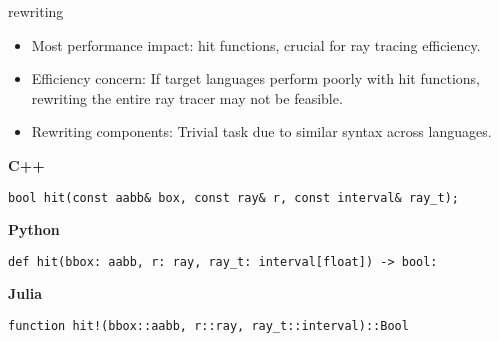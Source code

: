 \begin{frame}[fragile]{rewriting}
    \begin{itemize}
        \item Most performance impact: hit functions, crucial for ray tracing efficiency.
        \pause
        \item Efficiency concern: If target languages perform poorly with hit functions, rewriting the entire ray tracer may not be feasible.
        \pause
        \item Rewriting components: Trivial task due to similar syntax across languages.
    \end{itemize}

\textbf{C++}
\begin{lstlisting}
bool hit(const aabb& box, const ray& r, const interval& ray_t);
\end{lstlisting}

\textbf{Python}
\begin{lstlisting}
def hit(bbox: aabb, r: ray, ray_t: interval[float]) -> bool:
\end{lstlisting} 

\textbf{Julia}
\begin{lstlisting}
function hit!(bbox::aabb, r::ray, ray_t::interval)::Bool
\end{lstlisting}
    
\end{frame}